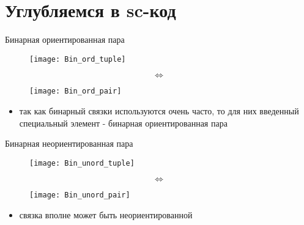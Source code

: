 \documentclass[hyperref={pdftex,unicode}]{beamer}
\newcommand{\objeqv}{
  \begin{center}
    \begin{sideways}
      \[ \Longleftrightarrow \]
    \end{sideways}
  \end{center}
}
\begin{document}
\section{Углубляемся в sc-код}
\begin{frame}{Бинарная ориентированная пара}
  \begin{center}
    \begin{figure}
      \texttt{[image: Bin\_ord\_tuple]}
    \end{figure}

    \objeqv

    \begin{figure}
      \texttt{[image: Bin\_ord\_pair]}
    \end{figure}
  \end{center}

  \begin{itemize}
  \item так как бинарный связки используются очень часто, то для них
    введенный специальный элемент - бинарная ориентированная пара
  \end{itemize}
\end{frame}

\begin{frame}{Бинарная неориентированная пара}
  \begin{center}
    \begin{figure}
      \texttt{[image: Bin\_unord\_tuple]}
    \end{figure}

    \objeqv

    \begin{figure}
      \texttt{[image: Bin\_unord\_pair]}
    \end{figure}
  \end{center}

  \begin{itemize}
  \item связка вполне может быть неориентированной
  \end{itemize}
\end{frame}


\end{document}
